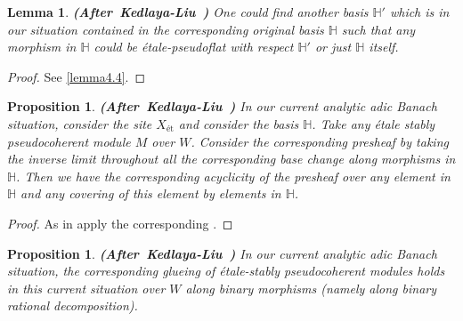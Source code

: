 \documentclass[12pt]{amsart}
\newtheorem{lemma}[theorem]{Lemma}
\newtheorem{proposition}[theorem]{Proposition}
\theoremstyle{definition}
\numberwithin{equation}{section}
\begin{document}
\begin{lemma}\mbox{\bf{(After Kedlaya-Liu \cite[Lemma 2.5.10]{KL2})}}
One could find another basis $\mathbb{H}'$ which is in our situation contained in the corresponding original basis $\mathbb{H}$ such that any morphism in $\mathbb{H}$ could be \'etale-pseudoflat with respect $\mathbb{H}'$ or just $\mathbb{H}$ itself.	
\end{lemma}


\begin{proof}
See \cref{lemma4.4}.
\end{proof}



\begin{proposition} \mbox{\bf{(After Kedlaya-Liu \cite[Theorem 2.5.11]{KL2})}}
In our current analytic adic Banach situation, consider the site $X_\text{\'et}$ and consider the basis $\mathbb{H}$. Take any \'etale stably pseudocoherent module $M$ over $W$. Consider the corresponding presheaf by taking the inverse limit throughout all the corresponding base change along morphisms in $\mathbb{H}$. Then we have the corresponding acyclicity of the presheaf over any element in $\mathbb{H}$ and any covering of this element by elements in $\mathbb{H}$.	
\end{proposition}


\begin{proof}
As in \cite[Theorem 2.5.11]{KL2} apply the corresponding \cite[Proposition 8.2.21]{KL1}.	
\end{proof}



\begin{proposition}\mbox{\bf{(After Kedlaya-Liu \cite[Lemma 2.5.13]{KL2})}}
In our current analytic adic Banach situation, the corresponding glueing of \'etale-stably pseudocoherent modules holds in this current situation over $W$ along binary morphisms (namely along binary rational decomposition). 	
\end{proposition}
\end{document}
